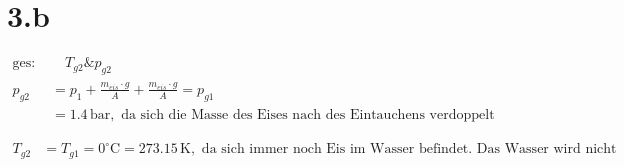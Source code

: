 \section*{3.b}
\begin{align*}
    \text{ges: } & \quad T_{g2} \& p_{g2} \\
    p_{g2} &= p_1 + \frac{m_{eis} \cdot g}{A} + \frac{m_{eis} \cdot g}{A} = p_{g1} \\
    &= 1.4 \, \text{bar}, \text{ da sich die Masse des Eises nach des Eintauchens verdoppelt (Dichteunterschied Vernachlässigbar) bleibt der Druck gleich}
\end{align*}

\begin{align*}
    T_{g2} &= T_{g1} = 0^\circ \text{C} = 273.15 \, \text{K}, \text{ da sich immer noch Eis im Wasser befindet. Das Wasser wird nicht wärmer solange das Eis noch nicht geschmolzen ist.}
\end{align*}